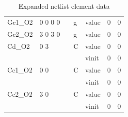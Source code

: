 \begin{table}[h]
\begin{tabular}[c]{lllllll}
\rowcolor{myyellow}
\small{Gc1\_O2} &\small{0 0 0 0 } & &\small{g} &\small{value} &$0$ &$0$ \\ 
\small{Gc2\_O2} &\small{3 0 3 0 } & &\small{g} &\small{value} &$0$ &$0$ \\ 
\rowcolor{myyellow}
\small{Cd\_O2} &\small{0 3 } & &\small{C} &\small{value} &$0$ &$0$ \\ 
 & & & &\small{vinit} &$0$ &$0$ \\ 
\rowcolor{myyellow}
\small{Cc1\_O2} &\small{0 0 } & &\small{C} &\small{value} &$0$ &$0$ \\ 
 & & & &\small{vinit} &$0$ &$0$ \\ 
\rowcolor{myyellow}
\small{Cc2\_O2} &\small{3 0 } & &\small{C} &\small{value} &$0$ &$0$ \\ 
 & & & &\small{vinit} &$0$ &$0$ \\ 
\end{tabular}
\caption{Expanded netlist element data}
\end{table}

